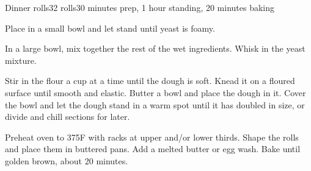 \documentclass[../Cookbook.tex]{subfiles}
\begin{document}
\begin{recipe}[DinnerRolls]{Dinner rolls}{32 rolls}{30 minutes prep, 1 hour standing, 20 minutes baking}

Place in a small bowl and let stand until yeast is foamy.

In a large bowl, mix together the rest of the wet ingredients. Whisk in the yeast mixture.

Stir in the flour a cup at a time until the dough is soft. Knead it on a floured surface until smooth and elastic. Butter a bowl and place the dough in it. Cover the bowl and let the dough stand in a warm spot until it has doubled in size, or divide and chill sections for later.

\newstep
Preheat oven to 375\0F with racks at upper and/or lower thirds. Shape the rolls and place them in buttered pans. Add a melted butter or egg wash. Bake until golden brown, about 20 minutes.

\end{recipe}
\end{document}
